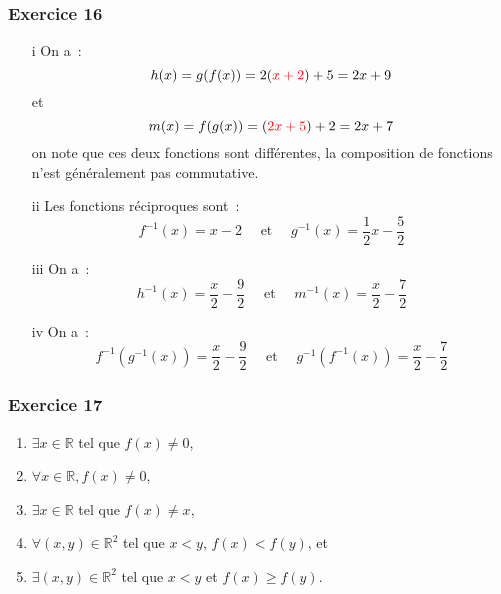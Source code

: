 \documentclass[10pt,notheorems]{beamer}
\newcommand{\red}{\color{red}}
\theoremstyle{plain}
\theoremstyle{definition} %
\begin{document}
\begin{frame}
  \frametitle{Exercice 16}
  \fontsize{8}{10}\selectfont

  \begin{enumerate}
  \item[i] On a~:
    \[
      h(x) = g(f(x)) = 2 ( {\red x + 2} ) + 5 = 2x+9
    \]
    et
    \[
      m(x) = f(g(x)) = ({\red 2x+5}) + 2 = 2x+ 7 
    \]
    on note que ces deux fonctions sont différentes, la composition de fonctions n'est généralement pas commutative.\newline
    
  \item[ii] Les fonctions réciproques sont~:
    \[
      f^{-1}(x) = x - 2 \quad\text{ et }\quad g^{-1}(x) = \frac{1}{2}x - \frac{5}{2}
    \]

  \item[iii] On a~:
    \[
      h^{-1}(x) = \frac{x}{2}-\frac{9}{2} \quad\text{ et }\quad m^{-1}(x) = \frac{x}{2}-\frac{7}{2}
    \]

  \item[iv] On a~:
    \[
      f^{-1}\left(g^{-1}(x)\right) = \frac{x}{2}-\frac{9}{2}  \quad\text{ et }\quad g^{-1}\left(f^{-1}(x)\right) = \frac{x}{2}-\frac{7}{2}
    \]
  \end{enumerate}

\end{frame}


\begin{frame}
  \frametitle{Exercice 17}
  \fontsize{8}{10}\selectfont

  \begin{enumerate}
  \item $\exists x\in\mathbb R$ tel que $f(x)\neq 0$,\newline
  \item $\forall x\in\mathbb R, f(x)\neq 0$,\newline
  \item $\exists x\in\mathbb R$ tel que $f(x)\neq x$,\newline
  \item $\forall (x,y)\in\mathbb R^2$ tel que $x<y$, $f(x)<f(y)$, et\newline
  \item $\exists (x,y)\in\mathbb R^2$ tel que $x<y$ et $f(x)\geq f(y)$.
  \end{enumerate}
  
\end{frame}
\end{document}
